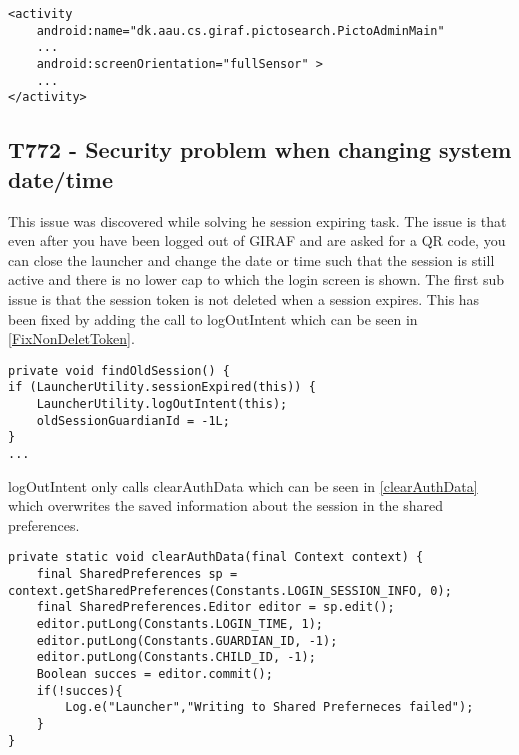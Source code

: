 \begin{minipage}[H]{\linewidth}
\begin{lstlisting}[caption = Allowing changes to the screen orientation., label = OrientAllow] 
<activity
	android:name="dk.aau.cs.giraf.pictosearch.PictoAdminMain"
    ...
    android:screenOrientation="fullSensor" >
    ...
</activity>
\end{lstlisting}
\end{minipage}

\subsection{T772 - Security problem when changing system date/time}\label{T772}
This issue was discovered while solving he session expiring task. The issue is
that even after you have been logged out of GIRAF and are asked for a QR code,
you can close the launcher and change the date or time such that the session is
still active and there is no lower cap to which the login screen is shown. The
first sub issue is that the session token is not deleted when a session expires.
This has been fixed by adding the call to logOutIntent which can be seen in
\autoref{FixNonDeletToken}.\nl

\begin{minipage}[H]{\linewidth}
\begin{lstlisting}[caption = Our solution to not clearing the token, label =
FixNonDeletToken] 
private void findOldSession() {
if (LauncherUtility.sessionExpired(this)) {
	LauncherUtility.logOutIntent(this);
    oldSessionGuardianId = -1L;
}
...
\end{lstlisting} 
\end{minipage}

logOutIntent only calls clearAuthData which can be seen in
\autoref{clearAuthData} which overwrites the saved information about the
session in the shared preferences.\nl

\begin{minipage}[H]{\linewidth}
\begin{lstlisting}[caption = ClearAuthData methode, label = clearAuthData]
private static void clearAuthData(final Context context) {
    final SharedPreferences sp = context.getSharedPreferences(Constants.LOGIN_SESSION_INFO, 0);
    final SharedPreferences.Editor editor = sp.edit();
    editor.putLong(Constants.LOGIN_TIME, 1);
    editor.putLong(Constants.GUARDIAN_ID, -1);
    editor.putLong(Constants.CHILD_ID, -1);
    Boolean succes = editor.commit();
    if(!succes){
    	Log.e("Launcher","Writing to Shared Preferneces failed");
    }
}
\end{lstlisting} 
\end{minipage}

